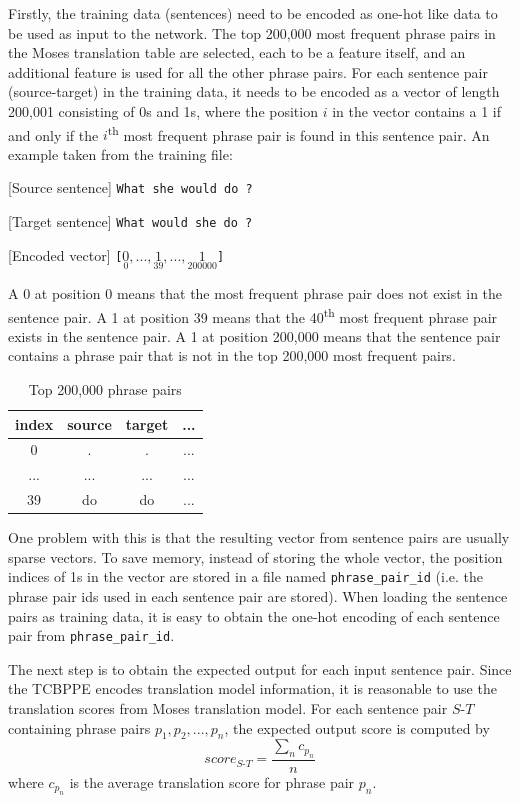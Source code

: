 \documentclass[12pt,a4paper,twoside,openright]{report}
\begin{document}
Firstly, the training data (sentences) need to be encoded as one-hot like data to be used as input to the network. The top 200,000 most frequent phrase pairs in the Moses translation table are selected, each to be a feature itself, and an additional feature is used for all the other phrase pairs. For each sentence pair (source-target) in the training data, it needs to be encoded as a vector of length 200,001 consisting of 0s and 1s, where the position $i$ in the vector contains a 1 if and only if the $i$\textsuperscript{th} most frequent phrase pair is found in this sentence pair. An example taken from the training file:

[Source sentence]
\texttt{What she would do ?}

[Target sentence]
\texttt{What would she do ?}

[Encoded vector]
\texttt{[$\underset{0}{0}, ..., \underset{39}{1}, ..., \underset{200000}{1}$]}

A 0 at position 0 means that the most frequent phrase pair does not exist in the sentence pair. A 1 at position 39 means that the 40\textsuperscript{th} most frequent phrase pair exists in the sentence pair. A 1 at position 200,000 means that the sentence pair contains a phrase pair that is not in the top 200,000 most frequent pairs.

\begin{table}[h!]
\centering
\begin{tabular}{ |c|c|c|c| } 
 \hline
 index & source & target & ... \\ [0.5ex] 
 \hline
 0 & . & . & ... \\ 
 ... & ... & ... & ... \\ 
 39 & do & do & ... \\ 
 \hline
\end{tabular}
\caption{Top 200,000 phrase pairs}
\label{table:pt_top_exmaple}
\end{table}

One problem with this is that the resulting vector from sentence pairs are usually sparse vectors. To save memory, instead of storing the whole vector, the position indices of 1s in the vector are stored in a file named \texttt{phrase\_pair\_id} (i.e. the phrase pair ids used in each sentence pair are stored). When loading the sentence pairs as training data, it is easy to obtain the one-hot encoding of each sentence pair from \texttt{phrase\_pair\_id}.

The next step is to obtain the expected output for each input sentence pair. Since the TCBPPE encodes translation model information, it is reasonable to use the translation scores from Moses translation model. For each sentence pair $S\textrm{-}T$ containing phrase pairs $p_1, p_2, ..., p_n$, the expected output score is computed by
\[ score_{S\textrm{-}T} = \frac{\sum_n c_{p_n}}{n} \]
where $c_{p_n}$ is the average translation score for phrase pair $p_n$.
\end{document}
